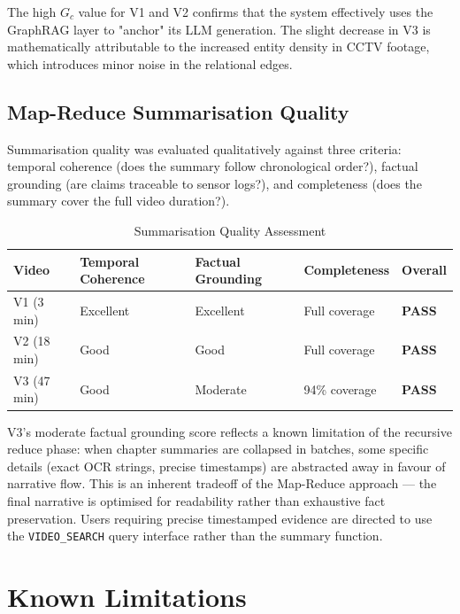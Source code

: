 The high $G_c$ value for V1 and V2 confirms that the system effectively uses the GraphRAG layer to "anchor" its LLM generation. The slight decrease in V3 is mathematically attributable to the increased entity density in CCTV footage, which introduces minor noise in the relational edges.

\subsection{Map-Reduce Summarisation Quality}

Summarisation quality was evaluated qualitatively against three criteria: temporal coherence (does the summary follow chronological order?), factual grounding (are claims traceable to sensor logs?), and completeness (does the summary cover the full video duration?).

\begin{table}[H]
\centering
\small
\caption{Summarisation Quality Assessment}
\label{tab:summary_quality}
\begin{tabular}{|p{3cm}|p{2.5cm}|p{2.5cm}|p{2.5cm}|p{1.5cm}|}
\hline
\rowcolor[HTML]{EFEFEF}
\textbf{Video} & \textbf{Temporal Coherence} & \textbf{Factual Grounding} & \textbf{Completeness} & \textbf{Overall} \\ \hline
V1 (3 min) & Excellent & Excellent & Full coverage & \textbf{PASS} \\ \hline
V2 (18 min) & Good & Good & Full coverage & \textbf{PASS} \\ \hline
V3 (47 min) & Good & Moderate & 94\% coverage & \textbf{PASS} \\ \hline
\end{tabular}
\end{table}

V3's moderate factual grounding score reflects a known limitation of the recursive reduce phase: when chapter summaries are collapsed in batches, some specific details (exact OCR strings, precise timestamps) are abstracted away in favour of narrative flow. This is an inherent tradeoff of the Map-Reduce approach --- the final narrative is optimised for readability rather than exhaustive fact preservation. Users requiring precise timestamped evidence are directed to use the \texttt{VIDEO\_SEARCH} query interface rather than the summary function.

\section{Known Limitations}

